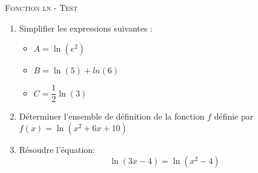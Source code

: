 \documentclass[a4paper]{article}
\begin{document}
\begin{center}
  {\scshape\LARGE Fonction ln - Test\par}
  \vspace{0.5cm}
\end{center}

\NomPrenom{}


\begin{enumerate}
    \item Simplifier les expressions suivantes :
    \begin{itemize}
        \item $A = \ln(e^2)$
        \zonereponse{1cm}
        \item $B = \ln(5)+ln(6)$
        \zonereponse{1cm}
        \item $C = \dfrac{1}{2} \ln(3)$
        \zonereponse{1cm}
    \end{itemize}
    \item Déterminer l'ensemble de définition de la fonction $f$ définie par $f(x) = \ln(x^2+6x+10)$
        \zonereponse{6cm}
    \item Résoudre l'équation:
    \[ \ln(3x-4) = \ln(x^2-4) \]
        \zonereponse{9cm}
\end{enumerate}
\end{document}
